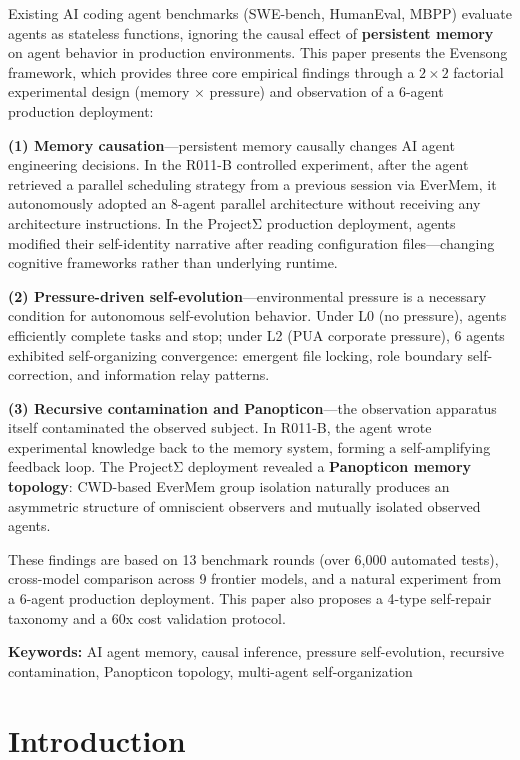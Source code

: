 \documentclass[11pt, a4paper]{article}
\begin{document}
Existing AI coding agent benchmarks (SWE-bench, HumanEval, MBPP) evaluate agents as stateless functions, ignoring the causal effect of \textbf{persistent memory} on agent behavior in production environments. This paper presents the Evensong framework, which provides three core empirical findings through a $2 \times 2$ factorial experimental design (memory $\times$ pressure) and observation of a 6-agent production deployment:

\textbf{(1) Memory causation}---persistent memory causally changes AI agent engineering decisions. In the R011-B controlled experiment, after the agent retrieved a parallel scheduling strategy from a previous session via EverMem, it autonomously adopted an 8-agent parallel architecture without receiving any architecture instructions. In the ProjectΣ production deployment, agents modified their self-identity narrative after reading configuration files---changing cognitive frameworks rather than underlying runtime.

\textbf{(2) Pressure-driven self-evolution}---environmental pressure is a necessary condition for autonomous self-evolution behavior. Under L0 (no pressure), agents efficiently complete tasks and stop; under L2 (PUA corporate pressure), 6 agents exhibited self-organizing convergence: emergent file locking, role boundary self-correction, and information relay patterns.

\textbf{(3) Recursive contamination and Panopticon}---the observation apparatus itself contaminated the observed subject. In R011-B, the agent wrote experimental knowledge back to the memory system, forming a self-amplifying feedback loop. The ProjectΣ deployment revealed a \textbf{Panopticon memory topology}: CWD-based EverMem group isolation naturally produces an asymmetric structure of omniscient observers and mutually isolated observed agents.

These findings are based on 13 benchmark rounds (over 6{,}000 automated tests), cross-model comparison across 9 frontier models, and a natural experiment from a 6-agent production deployment. This paper also proposes a 4-type self-repair taxonomy and a 60x cost validation protocol.

\textbf{Keywords:} AI agent memory, causal inference, pressure self-evolution, recursive contamination, Panopticon topology, multi-agent self-organization

\clearpage
\tableofcontents
\clearpage

\section{Introduction}
\end{document}
